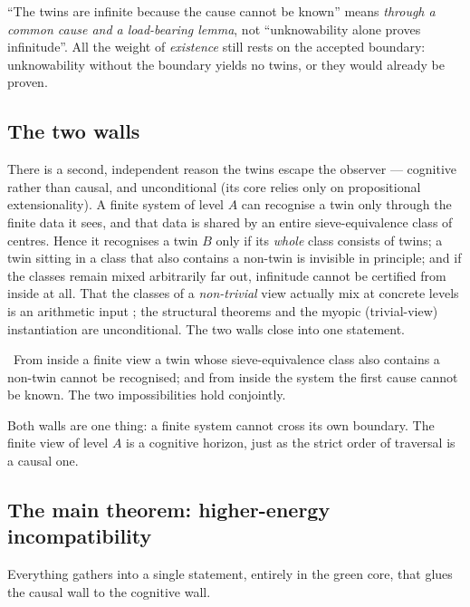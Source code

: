\begin{remark}
``The twins are infinite because the cause cannot be known'' means \emph{through a common cause and a
load-bearing lemma}, not ``unknowability alone proves infinitude''. All the weight of \emph{existence}
still rests on the accepted boundary: unknowability without the boundary yields no twins, or they
would already be proven.
\end{remark}

\subsection{The two walls}

There is a second, independent reason the twins escape the observer --- cognitive rather than causal,
and unconditional (its core relies only on propositional extensionality). A finite system of level
$A$ can recognise a twin only through the finite data it sees, and that data is shared by an entire
sieve-equivalence class of centres. Hence it recognises a twin $B$ only if its \emph{whole} class
consists of twins; a twin sitting in a class that also contains a non-twin is invisible in principle;
and if the classes remain mixed arbitrarily far out, infinitude cannot be certified from inside at
all. That the classes of a \emph{non-trivial} view actually mix at concrete levels is an arithmetic
input \red{}; the structural theorems and the myopic (trivial-view) instantiation are unconditional.
The two walls close into one statement.

\begin{theorem}\label{thm:two_walls_one_nature}
\green{}\ From inside a finite view a twin whose sieve-equivalence class also contains a non-twin
cannot be recognised; and from inside the system the first cause cannot be known. The two
impossibilities hold conjointly. 
\end{theorem}

Both walls are one thing: a finite system cannot cross its own boundary. The finite view of level $A$
is a cognitive horizon, just as the strict order of traversal is a causal one.

\subsection{The main theorem: higher-energy incompatibility}

Everything gathers into a single statement, entirely in the green core, that glues the causal wall to
the cognitive wall.


